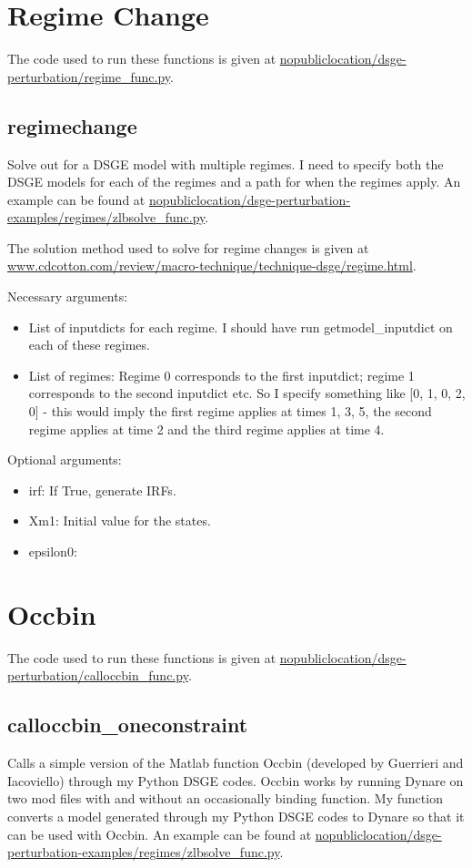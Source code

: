 \documentclass{article}
\theoremstyle{definition}
\begin{document}
\section{Regime Change}
The code used to run these functions is given at \url{nopubliclocation/dsge-perturbation/regime_func.py}.

\subsection{regimechange}
Solve out for a DSGE model with multiple regimes. I need to specify both the DSGE models for each of the regimes and a path for when the regimes apply. An example can be found at \url{nopubliclocation/dsge-perturbation-examples/regimes/zlbsolve_func.py}.

The solution method used to solve for regime changes is given at \url{www.cdcotton.com/review/macro-technique/technique-dsge/regime.html}.

Necessary arguments:
\begin{itemize}
    \item List of inputdicts for each regime. I should have run getmodel\_inputdict on each of these regimes.
    \item List of regimes: Regime 0 corresponds to the first inputdict; regime 1 corresponds to the second inputdict etc. So I specify something like [0, 1, 0, 2, 0] - this would imply the first regime applies at times 1, 3, 5, the second regime applies at time 2 and the third regime applies at time 4.
\end{itemize}

Optional arguments:
\begin{itemize}
    \item irf: If True, generate IRFs.
    \item Xm1: Initial value for the states.
    \item epsilon0: 
\end{itemize}

\section{Occbin}
The code used to run these functions is given at \url{nopubliclocation/dsge-perturbation/calloccbin_func.py}.

\subsection{calloccbin\_oneconstraint}
Calls a simple version of the Matlab function Occbin (developed by Guerrieri and Iacoviello) through my Python DSGE codes. Occbin works by running Dynare on two mod files with and without an occasionally binding function. My function converts a model generated through my Python DSGE codes to Dynare so that it can be used with Occbin. An example can be found at \url{nopubliclocation/dsge-perturbation-examples/regimes/zlbsolve_func.py}.
\end{document}
